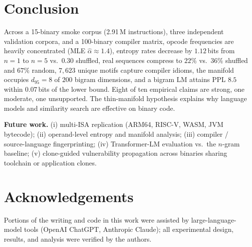 \documentclass[conference]{IEEEtran}
\begin{document}
\section{Conclusion}
\label{sec:conclusion}

Across a 15-binary smoke corpus (2.91\,M instructions), three
independent validation corpora, and a 100-binary compiler matrix,
opcode frequencies are heavily concentrated
(MLE $\hat{\alpha}{\approx}1.4$), entropy rates decrease by
$1.12$\,bits from $n{=}1$ to $n{=}5$ vs.\ $0.30$ shuffled, real
sequences compress to $22\%$ vs.\ $36\%$ shuffled and $67\%$ random,
$7{,}623$ unique motifs capture compiler idioms, the manifold
occupies $d_{95}{=}8$ of $200$ bigram dimensions, and a bigram LM
attains PPL $8.5$ within $0.07$\,bits of the lower bound.
Eight of ten empirical claims are strong, one moderate, one
unsupported.  The thin-manifold hypothesis explains why language
models and similarity search are effective on binary code.

\textbf{Future work.}
(i) multi-ISA replication (ARM64, RISC-V, WASM, JVM bytecode);
(ii) operand-level entropy and manifold analysis;
(iii) compiler / source-language fingerprinting;
(iv) Transformer-LM evaluation vs.\ the $n$-gram baseline;
(v) clone-guided vulnerability propagation across binaries sharing
toolchain or application clones.

\section*{Acknowledgements}
Portions of the writing and code in this work were assisted by
large-language-model tools (OpenAI ChatGPT, Anthropic Claude); all
experimental design, results, and analysis were verified by the
authors.



\end{document}
